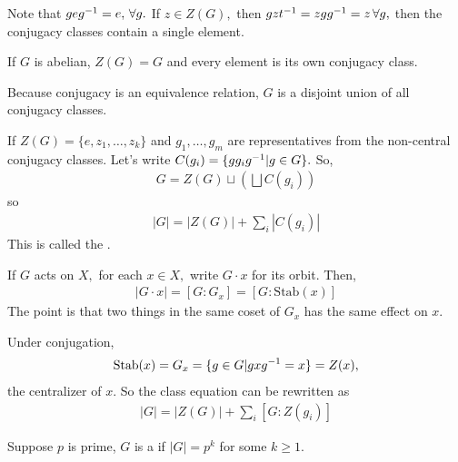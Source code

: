 \documentclass[a4paper]{article}
\begin{document}
Note that $geg^{-1}=e,\,\forall g.$ If $z\in Z(G),$ then $gzt^{-1}=zgg^{-1}=z\,\forall g,$ then the conjugacy classes contain a single element.

If $G$ is abelian, $Z(G)=G$ and every element is its own conjugacy class.

Because conjugacy is an equivalence relation, $G$ is a disjoint union of all conjugacy classes.

If $Z(G)=\{e,z_1,\dots,z_k\}$ and $g_1,\dots,g_m$ are representatives from the non-central conjugacy classes. Let's write $C(g_i)=\{gg_ig^{-1}|g\in G\}.$ So,\begin{align}
    G=Z(G)\sqcup\left(\bigsqcup C(g_i)\right)
\end{align}
so \begin{align}
    |G|=|Z(G)|+\sum_i|C(g_i)|
\end{align}
This is called the .\begin{theorem}
    If $G$ acts on $X,$ for each $x\in X,$ write $G\cdot x$ for its orbit. Then,\begin{align}
        |G\cdot x|=[G:G_x]=[G:\mathrm{Stab}(x)]
    \end{align}
    The point is that two things in the same coset of $G_x$ has the same effect on $x$.
\end{theorem}
Under conjugation, \begin{align}
    \mathrm{Stab}(x)=G_x=\{g\in G|gxg^{-1}=x\}=Z(x),
\end{align}
the centralizer of $x$. So the class equation can be rewritten as \begin{align}
    |G|=|Z(G)|+\sum_{i}[G:Z(g_i)]
\end{align}
\begin{definition}[$p$-group]
    Suppose $p$ is prime, $G$ is a  if $|G|=p^k$ for some $k\geq 1.$
\end{definition}
\end{document}
